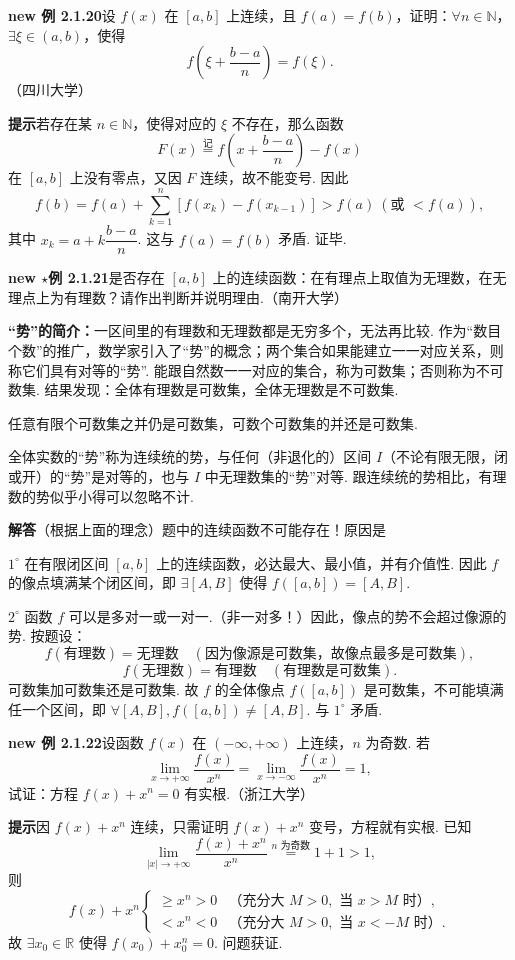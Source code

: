 \documentclass[UTF8, 12pt, fontset=fandol, oneside]{ctexart}
\begin{document}
\noindent\textbf{new 例 2.1.20}\quad 设 $f(x)$ 在 $[a,b]$ 上连续，且 $f(a)=f(b)$，证明：$\forall n\in\mathbb{N}$，$\exists\xi\in(a,b)$，使得
\[
  f\left(\xi+\frac{b-a}{n}\right)=f(\xi).
\]
（四川大学）

\noindent\textbf{提示}\quad 若存在某 $n\in\mathbb{N}$，使得对应的 $\xi$ 不存在，那么函数
\[
  F(x)\overset{\text{记}}=f\left(x+\frac{b-a}{n}\right)-f(x)
\]
在 $[a,b]$ 上没有零点，又因 $F$ 连续，故不能变号. 因此
\[
  f(b)=f(a)+\sum_{k=1}^{n}[f(x_k)-f(x_{k-1})]>f(a)\ (\text{或 }<f(a)),
\]
其中 $x_k=a+k\dfrac{b-a}{n}$. 这与 $f(a)=f(b)$ 矛盾. 证毕.

\noindent\textbf{new $\star$例 2.1.21}\quad 是否存在 $[a,b]$ 上的连续函数：在有理点上取值为无理数，在无理点上为有理数？请作出判断并说明理由.（南开大学）

\noindent\textbf{“势”的简介：}\quad 一区间里的有理数和无理数都是无穷多个，无法再比较. 作为“数目个数”的推广，数学家引入了“势”的概念；两个集合如果能建立一一对应关系，则称它们具有对等的“势”. 能跟自然数一一对应的集合，称为可数集；否则称为不可数集. 结果发现：全体有理数是可数集，全体无理数是不可数集.

任意有限个可数集之并仍是可数集，可数个可数集的并还是可数集.

全体实数的“势”称为连续统的势，与任何（非退化的）区间 $I$（不论有限无限，闭或开）的“势”是对等的，也与 $I$ 中无理数集的“势”对等. 跟连续统的势相比，有理数的势似乎小得可以忽略不计.

\noindent\textbf{解答}\quad （根据上面的理念）题中的连续函数不可能存在！原因是

$1^\circ$ 在有限闭区间 $[a,b]$ 上的连续函数，必达最大、最小值，并有介值性. 因此 $f$ 的像点填满某个闭区间，即 $\exists[A,B]$ 使得 $f([a,b])=[A,B]$.

$2^\circ$ 函数 $f$ 可以是多对一或一对一.（非一对多！）因此，像点的势不会超过像源的势. 按题设：
\[
  f(\text{有理数})=\text{无理数}\quad(\text{因为像源是可数集，故像点最多是可数集}),
\]
\[
  f(\text{无理数})=\text{有理数}\quad(\text{有理数是可数集}).
\]
可数集加可数集还是可数集. 故 $f$ 的全体像点 $f([a,b])$ 是可数集，不可能填满
任一个区间，即 $\forall[A,B],f([a,b])\ne[A,B]$. 与 $1^\circ$ 矛盾.

\noindent\textbf{new 例 2.1.22}\quad 设函数 $f(x)$ 在 $(-\infty,+\infty)$ 上连续，$n$ 为奇数. 若
\[
  \lim_{x\to+\infty}\frac{f(x)}{x^n}
  =
  \lim_{x\to-\infty}\frac{f(x)}{x^n}=1,
\]
试证：方程 $f(x)+x^n=0$ 有实根.（浙江大学）

\noindent\textbf{提示}\quad 因 $f(x)+x^n$ 连续，只需证明 $f(x)+x^n$ 变号，方程就有实根. 已知
\[
  \lim_{|x|\to+\infty}\frac{f(x)+x^n}{x^n}
  \overset{n\text{ 为奇数}}=1+1>1,
\]
则
\[
  f(x)+x^n
  \begin{cases}
    \ge x^n>0 & \text{（充分大 }M>0,\text{ 当 }x>M\text{ 时）},\\
    <x^n<0 & \text{（充分大 }M>0,\text{ 当 }x<-M\text{ 时）}.
  \end{cases}
\]
故 $\exists x_0\in\mathbb{R}$ 使得 $f(x_0)+x_0^n=0$. 问题获证.
\end{document}

